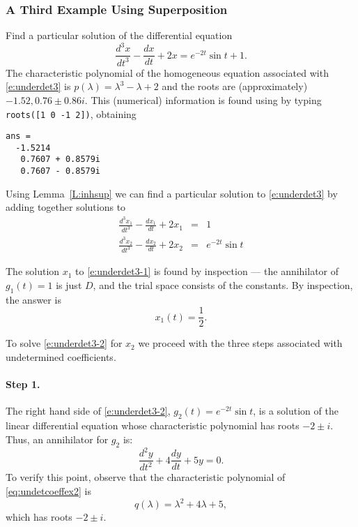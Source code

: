 \documentclass{ximera}
\begin{document}
\subsubsection*{A Third Example Using Superposition}

Find a particular solution of the differential equation
\begin{equation}  \label{e:underdet3}
\frac{d^3x}{dt^3} -\frac{dx}{dt} + 2x = e^{-2t}\sin t + 1.
\end{equation}
The characteristic polynomial of the homogeneous equation associated with 
\eqref{e:underdet3} is $p(\lambda)=\lambda^3-\lambda+2$ and the roots are 
(approximately) $-1.52, 0.76 \pm 0.86i$.  This (numerical) information is
found using \Matlab by typing 
{\tt roots([1 0 -1 2])}, obtaining
\begin{verbatim}
ans =
  -1.5214       
   0.7607 + 0.8579i     
   0.7607 - 0.8579i
\end{verbatim}

Using Lemma~\ref{L:inhsup} we can find a particular solution to 
\eqref{e:underdet3} by adding together solutions to 
\begin{eqnarray}
\frac{d^3x_1}{dt^3} -\frac{dx_1}{dt} + 2x_1 & = & 1 \label{e:underdet3-1}\\
\frac{d^3x_2}{dt^3} -\frac{dx_2}{dt} + 2x_2 & = & e^{-2t}\sin t 
\label{e:underdet3-2}
\end{eqnarray}

The solution $x_1$ to \eqref{e:underdet3-1} is found by inspection --- the 
annihilator of $g_1(t)=1$ is just $D$, 
and the trial space consists of 
the constants.  By inspection, the answer is 
\[
x_1(t) = \frac{1}{2}.
\]

To solve \eqref{e:underdet3-2} for $x_2$ we proceed with the three steps 
associated with undetermined coefficients.

\paragraph{Step 1.} The right hand side of \eqref{e:underdet3-2}, 
$g_2(t)=e^{-2t}\sin t$, is a solution of the linear differential equation 
whose characteristic polynomial has roots $-2\pm i$.  Thus, an 
annihilator for $g_2$ is:
\begin{equation}  \label{eq:undetcoeffex2}
\frac{d^2y}{dt^2} +4\frac{dy}{dt} +5y = 0.
\end{equation}
To verify this point, observe that the characteristic 
polynomial of  
\eqref{eq:undetcoeffex2} is
\[
q(\lambda) = \lambda^2 + 4\lambda +5,
\]
which has roots $-2\pm i$.  
\end{document}
